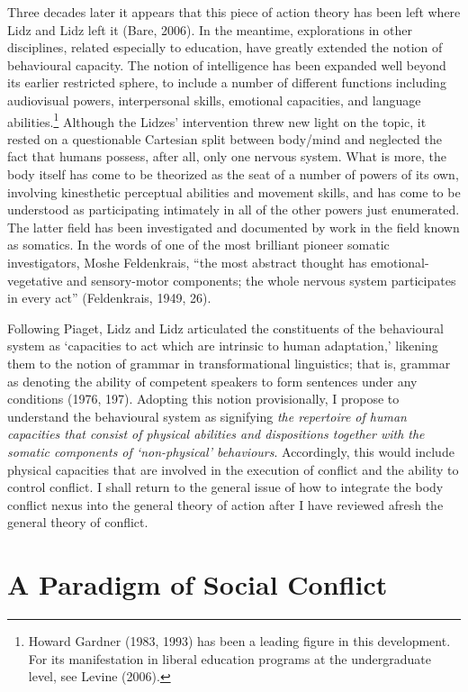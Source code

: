Three decades later it appears that this piece of action theory has been left where Lidz and Lidz left it (Bare, 2006). In the meantime, explorations in other disciplines, related especially to education, have greatly extended the notion of behavioural capacity. The notion of intelligence has been expanded well beyond its earlier restricted sphere, to include a number of different functions including audiovisual powers, interpersonal skills, emotional capacities, and language abilities.\footnote{Howard Gardner (1983, 1993) has been a leading figure in this development. For its manifestation in liberal education programs at the undergraduate level, see Levine (2006).} Although the Lidzes' intervention threw new light on the topic, it rested on a questionable Cartesian split between body/mind and neglected the fact that humans possess, after all, only one nervous system. What is more, the body itself has come to be theorized as the seat of a number of powers of its own, involving kinesthetic perceptual abilities and movement skills, and has come to be understood as participating intimately in all of the other powers just enumerated. The latter field has been investigated and documented by work in the field known as somatics. In the words of one of the most brilliant pioneer somatic investigators, Moshe Feldenkrais, ``the most abstract thought has emotional- vegetative and sensory-motor components; the whole nervous system participates in every act'' (Feldenkrais, 1949, 26).

Following Piaget, Lidz and Lidz articulated the constituents of the behavioural system as `capacities to act which are intrinsic to human adaptation,' likening them to the notion of grammar in transformational linguistics; that is, grammar as denoting the ability of competent speakers to form sentences under any conditions (1976, 197). Adopting this notion provisionally, I propose to understand the behavioural system as signifying \emph{the repertoire of human capacities that consist of physical abilities and dispositions together with the somatic components of `non-physical' behaviours}. Accordingly, this would include physical capacities that are involved in the execution of conflict and the ability to control conflict. I shall return to the general issue of how to integrate the body conflict nexus into the general theory of action after I have reviewed afresh the general theory of conflict.

\section*{A Paradigm of Social Conflict}

